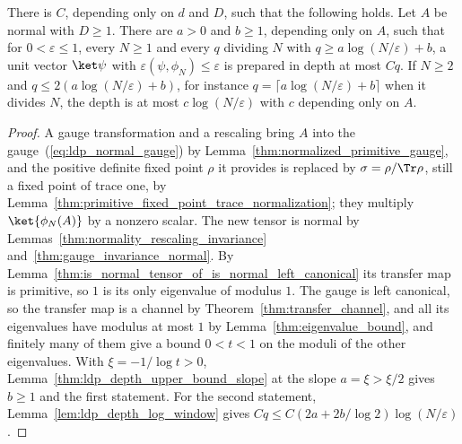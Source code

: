 \begin{lemma}
    \label{thm:ldp_depth_upper_bound_divisible}
    \leanok
    There is $C$, depending only on $d$ and $D$, such that the following holds.
    Let $A$ be normal with $D\ge1$. There are $a>0$ and $b\ge1$, depending only
    on $A$, such that for $0<\varepsilon\le1$, every $N\ge1$ and every $q$
    dividing $N$ with
    $q\ge a\log(N/\varepsilon)+b$, a unit vector $\ket\psi$ with
    $\varepsilon(\psi,\phi_N)\le\varepsilon$ is prepared in depth at most $Cq$.
    If $N\ge2$ and $q\le2(a\log(N/\varepsilon)+b)$, for instance
    $q=\lceil a\log(N/\varepsilon)+b\rceil$ when it divides $N$, the depth is at most
    $c\log(N/\varepsilon)$ with $c$ depending only on $A$.
\end{lemma}
\begin{proof}
    \leanok
    A gauge transformation and a rescaling bring $A$ into the
    gauge~(\ref{eq:ldp_normal_gauge}) by
    Lemma~\ref{thm:normalized_primitive_gauge}, and the positive definite
    fixed point $\rho$ it provides is replaced by
    $\sigma=\rho/\Tr\rho$, still a fixed point of trace one, by
    Lemma~\ref{thm:primitive_fixed_point_trace_normalization}; they multiply
    $\ket{\phi_N(A)}$ by a nonzero scalar. The new tensor is normal by
    Lemmas~\ref{thm:normality_rescaling_invariance}
    and~\ref{thm:gauge_invariance_normal}. By
    Lemma~\ref{thm:is_normal_tensor_of_is_normal_left_canonical} its transfer
    map is primitive, so $1$ is its only eigenvalue of modulus $1$. The gauge is
    left canonical, so the transfer map is a channel by
    Theorem~\ref{thm:transfer_channel}, and all its eigenvalues have modulus at
    most $1$ by Lemma~\ref{thm:eigenvalue_bound},
    and finitely many of them give a bound $0<t<1$ on the
    moduli of the other eigenvalues. With $\xi=-1/\log t>0$,
    Lemma~\ref{thm:ldp_depth_upper_bound_slope} at the slope $a=\xi>\xi/2$
    gives $b\ge1$ and the first statement. For the second statement,
    Lemma~\ref{lem:ldp_depth_log_window} gives
    $Cq\le C(2a+2b/\log2)\log(N/\varepsilon)$.
\end{proof}

